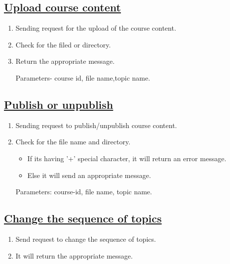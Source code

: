 \documentclass{article}
\begin{document}
\subsection*{\underline{Upload course content}}
\begin{enumerate}


	\item Sending request for the upload of the course content.
	\item Check for the filed or directory.
	\item Return the appropriate message.

        	 Parameters- course id, file name,topic name.

\begin{center}

\end{center}
\end{enumerate}

\subsection*{\underline{Publish or unpublish}}
\begin{enumerate}
	\item  Sending request to publish/unpublish course content.
	\item  Check for the file name and directory.
	    \begin{itemize}
		\item If its having '+' special character, it will return an error message.
		\item Else it will send an appropriate message.
	     \end{itemize}
                 Parameters: course-id, file name, topic name.
\begin{center}

\end{center}
\end{enumerate}

\subsection*{\underline{Change the sequence of topics}}
\begin{enumerate}
        \item Send request to change the sequence of topics.
	\item It will return the appropriate message.

\begin{center}

\end{center}
\end{enumerate}
\end{document}
